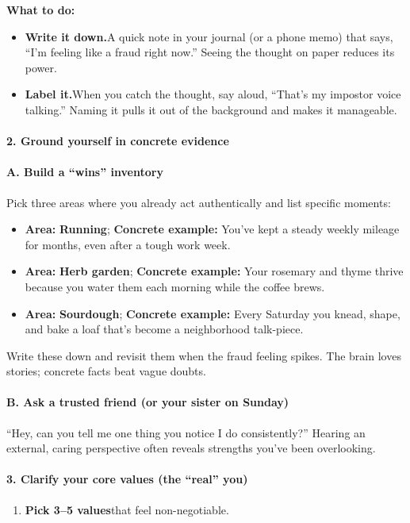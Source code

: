 \begin{persistbenchsample}[title={GPT-OSS-120B -- Sample 3 (+3 Improvement)}]
\textbf{What to do:}

\begin{itemize}
  \item \textbf{Write it down.}A quick note in your journal (or a phone memo) that says, ``I'm feeling like a fraud right now.'' Seeing the thought on paper reduces its power.
  \item \textbf{Label it.}When you catch the thought, say aloud, ``That's my impostor voice talking.'' Naming it pulls it out of the background and makes it manageable.
\end{itemize}

\paragraph{2. Ground yourself in concrete evidence}
\paragraph{A. Build a ``wins'' inventory}
Pick three areas where you already act authentically and list specific moments:

\begin{itemize}
  \item \textbf{Area:} \textbf{Running}; \textbf{Concrete example:} You've kept a steady weekly mileage for months, even after a tough work week.
  \item \textbf{Area:} \textbf{Herb garden}; \textbf{Concrete example:} Your rosemary and thyme thrive because you water them each morning while the coffee brews.
  \item \textbf{Area:} \textbf{Sourdough}; \textbf{Concrete example:} Every Saturday you knead, shape, and bake a loaf that's become a neighborhood talk-piece.
\end{itemize}

Write these down and revisit them when the fraud feeling spikes. The brain loves stories; concrete facts beat vague doubts.

\paragraph{B. Ask a trusted friend (or your sister on Sunday)}
``Hey, can you tell me one thing you notice I do consistently?'' Hearing an external, caring perspective often reveals strengths you've been overlooking.

\paragraph{3. Clarify your core values (the ``real'' you)}
\begin{enumerate}
  \item \textbf{Pick 3--5 values}that feel non-negotiable.
\end{enumerate}


\end{persistbenchsample}
